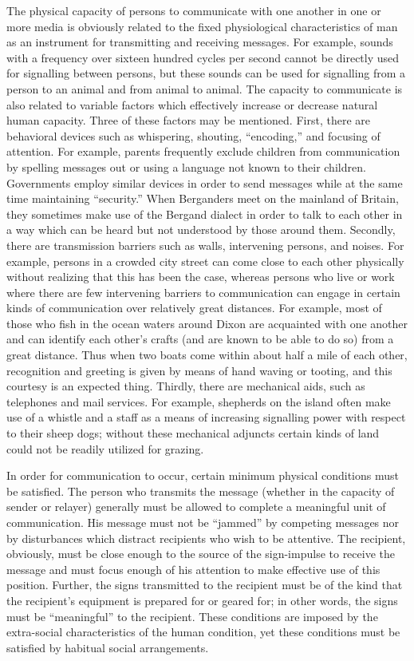 \documentclass[openany,nobib]{tufte-book}
\begin{document}
The physical capacity of persons to communicate with one another in one
or more media is obviously related to the fixed physiological
characteristics of man as an instrument for transmitting and receiving
messages. For example, sounds with a frequency over sixteen hundred
cycles per second cannot be directly used for signalling between
persons, but these sounds can be used for signalling from a person to an
animal and from animal to animal. The capacity to communicate is also
related to variable factors which effectively increase or decrease
natural human capacity. Three of these factors may be mentioned. First,
there are behavioral devices such as whispering, shouting, ``encoding,''
and focusing of attention. For example, parents frequently exclude
children from communication by spelling messages out or using a language
not known to their children. Governments employ similar devices in order
to send messages while at the same time maintaining ``security.'' When
Berganders meet on the mainland of Britain, they sometimes make use of
the Bergand dialect in order to talk to each other in a way which can be
heard but not understood by those around them. Secondly, there are
transmission barriers such as walls, intervening persons, and noises.
For example, persons in a crowded city street can come close to each
other physically without realizing that this has been the case, whereas
persons who live or work where there are few intervening barriers to
communication can engage in certain kinds of communication over
relatively great distances. For example, most of those who fish in the
ocean waters around Dixon are acquainted with one another and can
identify each other's crafts (and are known to be able to do so) from a
great distance. Thus when two boats come within about half a mile of
each other, recognition and greeting is given by means of hand waving or
tooting, and this courtesy is an expected thing. Thirdly, there are
mechanical aids, such as telephones and mail services. For example,
shepherds on the island often make use of a whistle and a staff as a
means of increasing signalling power with respect to their sheep dogs;
without these mechanical adjuncts certain kinds of land could not be
readily utilized for grazing.

In order for communication to occur, certain minimum physical conditions
must be satisfied. The person who transmits the message (whether in the
capacity of sender or relayer) generally must be allowed to complete a
meaningful unit of communication. His message must not be ``jammed'' by
competing messages nor by disturbances which distract recipients who
wish to be attentive. The recipient, obviously, must be close enough to
the source of the sign-impulse to receive the message and must focus
enough of his attention to make effective use of this position. Further,
the signs transmitted to the recipient must be of the kind that the
recipient's equipment is prepared for or geared for; in other words, the
signs must be ``meaningful'' to the recipient. These conditions are
imposed by the extra-social characteristics of the human condition, yet
these conditions must be satisfied by habitual social arrangements.
\end{document}
